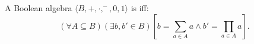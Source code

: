A Boolean algebra $\langle B, +, \cdot, ^-, 0, 1 \rangle$ is  iff:
$$(\forall A \subseteq B)(\exists b, b' \in B)\left[b = \sum_{a \in A} a \land b' = \prod_{a \in A} a\right].$$
